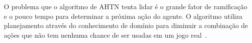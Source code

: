 O problema que o algoritmo de AHTN tenta lidar é o grande fator de ramificação e o pouco tempo para determinar a próxima ação do agente. O algoritmo utiliza planejamento através do conhecimento de domínio para diminuir a combinação de ações que não tem nenhuma chance de ser usadas em um jogo real~\cite{ontanon2015adversarial}. 


